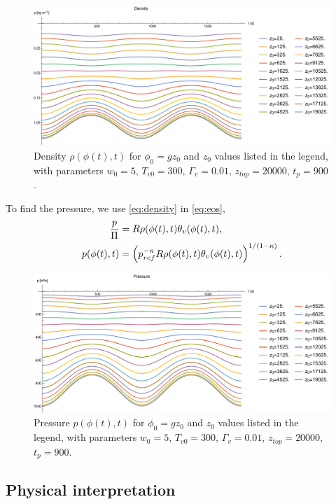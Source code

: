 \begin{figure}[H]
  \centering
  \includegraphics[width=\linewidth]{figures/density_plot}
  \caption{Density $\rho(\phi(t),t)$ for $\phi_0 = gz_0$ and $z_0$ values listed in the legend, with parameters $w_0=5$, $T_{v0}=300$, $\Gamma_v=0.01$, $z_{top}=20000$, $t_p=900$.}\label{fig:density}
\end{figure}

To find the pressure, we use \eqref{eq:density} in \eqref{eq:eos},
\begin{align}
  \frac{p}{\Pi} &= R\rho(\phi(t),t)\theta_v(\phi(t),t),\notag \\
  p(\phi(t),t) &= \left(p_{ref}^{-\kappa} R \rho(\phi(t),t)\theta_v(\phi(t),t)\right)^{1/(1-\kappa)}.\label{eq:pressure}
\end{align}

\begin{figure}[H]
  \centering
  \includegraphics[width=\linewidth]{figures/pressure_plot}
  \caption{Pressure $p(\phi(t),t)$ for $\phi_0 = gz_0$ and $z_0$ values listed in the legend, with parameters $w_0=5$, $T_{v0}=300$, $\Gamma_v=0.01$, $z_{top}=20000$, $t_p=900$.}\label{fig:pressure}
\end{figure}

\subsection{Physical interpretation}

